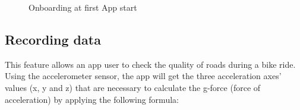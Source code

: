 \documentclass[10pt,a4paper]{article} %
\begin{document}
	\begin{figure}[H]
	  \centering
	  \hfill
	  \hfill
	  \caption{Onboarding at first App start}
	  \label{fig:onboarding}
	\end{figure}





    
    
    \subsection{ Recording data}
    	This feature allows an app user to check the quality of roads during a bike ride.
    	Using the accelerometer sensor, the app will get the three acceleration axes' values (x, y and z) that are necessary to calculate the g-force (force of acceleration) by applying the following formula:
\end{document}
